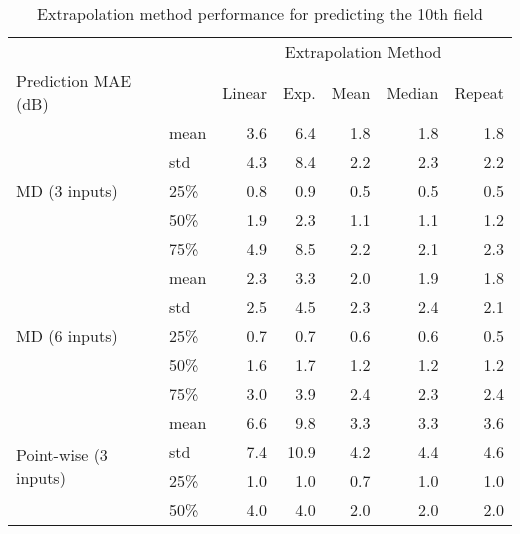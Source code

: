 \begin{table}[t]
\centering
\caption{Extrapolation method performance for predicting the 10th field}
\begin{tabular}{@{}llrrrrr}
	\toprule
	                                                  &      &   \multicolumn{5}{c}{Extrapolation Method}    \\
	\cmidrule{3-7}                      
	Prediction \ac{MAE} (dB)              &      & Linear & Exp. & Mean & Median & Repeat \\ \midrule
	\multirow{5}{*}{MD (3 inputs)}         & mean &    3.6 &         6.4 &  1.8 &    1.8 &    1.8 \\
	                                                  & std  &    4.3 &         8.4 &  2.2 &    2.3 &    2.2 \\
	                                                  & 25\% &    0.8 &         0.9 &  0.5 &    0.5 &    0.5 \\
	                                                  & 50\% &    1.9 &         2.3 &  1.1 &    1.1 &    1.2 \\
	                                                  & 75\% &    4.9 &         8.5 &  2.2 &    2.1 &    2.3 \\ \midrule
	\multirow{5}{*}{MD (6 inputs)}         & mean &    2.3 &         3.3 &  2.0 &    1.9 &    1.8 \\
	                                                  & std  &    2.5 &         4.5 &  2.3 &    2.4 &    2.1 \\
	                                                  & 25\% &    0.7 &         0.7 &  0.6 &    0.6 &    0.5 \\
	                                                  & 50\% &    1.6 &         1.7 &  1.2 &    1.2 &    1.2 \\
	                                                  & 75\% &    3.0 &         3.9 &  2.4 &    2.3 &    2.4 \\ \midrule
	\multirow{5}{*}{Point-wise (3 inputs)} & mean &    6.6 &         9.8 &  3.3 &    3.3 &    3.6 \\
	                                                  & std  &    7.4 &        10.9 &  4.2 &    4.4 &    4.6 \\
	                                                  & 25\% &    1.0 &         1.0 &  0.7 &    1.0 &    1.0 \\
	                                                  & 50\% &    4.0 &         4.0 &  2.0 &    2.0 &    2.0 \\

\end{tabular}
\end{table}

